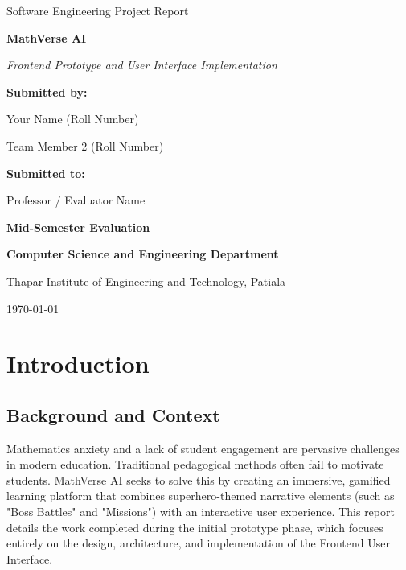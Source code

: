 \documentclass[12pt,a4paper]{report}
\begin{document}
\begin{titlepage}
    \centering
    \vspace*{2cm}
    
    {\Large Software Engineering Project Report \par}
    \vspace{1.5cm}
    
    {\Huge\bfseries MathVerse AI \par}
    \vspace{0.5cm}
    {\Large \textit{Frontend Prototype and User Interface Implementation} \par}
    
    \vspace{3cm}
    
    {\Large \textbf{Submitted by:} \par}
    Your Name (Roll Number) \par
    Team Member 2 (Roll Number) \par
    \vspace{1.5cm}
    
    {\Large \textbf{Submitted to:} \par}
    Professor / Evaluator Name \par
    
    \vfill
    
    {\Large \textbf{Mid-Semester Evaluation} \par}
    {\Large \textbf{Computer Science and Engineering Department} \par}
    {\Large Thapar Institute of Engineering and Technology, Patiala \par}
    \vspace{1cm}
    
    {\large \today \par}
\end{titlepage}

\tableofcontents
\newpage

\chapter{Introduction}

\section{Background and Context}
Mathematics anxiety and a lack of student engagement are pervasive challenges in modern education. Traditional pedagogical methods often fail to motivate students. MathVerse AI seeks to solve this by creating an immersive, gamified learning platform that combines superhero-themed narrative elements (such as "Boss Battles" and "Missions") with an interactive user experience. This report details the work completed during the initial prototype phase, which focuses entirely on the design, architecture, and implementation of the Frontend User Interface.
\end{document}

